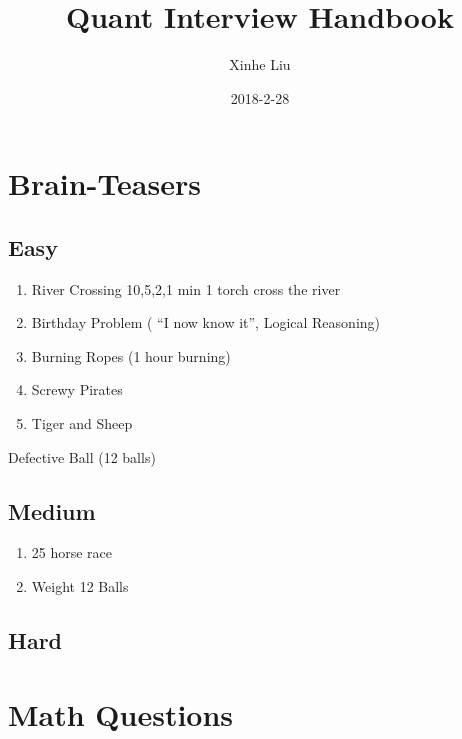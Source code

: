 \documentclass[11pt, openany]{book}              %
\title{\bf Quant Interview Handbook}    %
\author{Xinhe Liu}              %
\date{2018-2-28}                           %
\begin{document}
\maketitle                              %
\tableofcontents                        %
\mainmatter                             %


\chapter{Brain-Teasers}                %

\section{Easy}
\begin{enumerate}
	\item  River Crossing 10,5,2,1 min 1 torch cross the river
	\item  Birthday Problem ( “I now know it”, Logical Reasoning)
	\item  Burning Ropes (1 hour burning)
	\item  Screwy Pirates
	\item  Tiger and Sheep
\end{enumerate}



Defective Ball (12 balls)



\section{Medium}

\begin{enumerate}
	\item 25 horse race
	\item Weight 12 Balls 
\end{enumerate}


\section{Hard}


\chapter{Math Questions}
\end{document}
